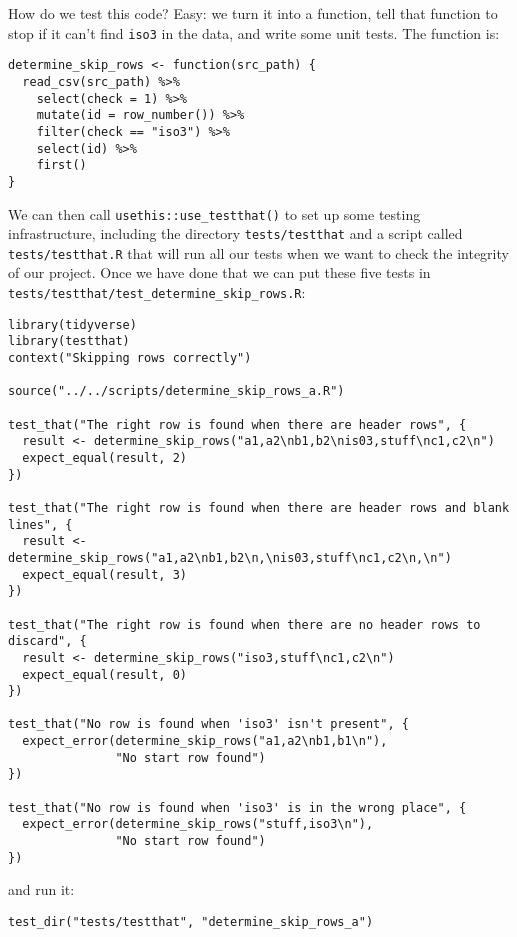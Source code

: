 How do we test this code?
Easy:
we turn it into a function,
tell that function to stop if it can't find \texttt{iso3} in the data,
and write some unit tests.
The function is:

\begin{lstlisting}
determine_skip_rows <- function(src_path) {
  read_csv(src_path) %>%
    select(check = 1) %>%
    mutate(id = row_number()) %>%
    filter(check == "iso3") %>%
    select(id) %>%
    first()
}
\end{lstlisting}

We can then call \texttt{usethis::use\_testthat()} to set up some testing infrastructure,
including the directory \texttt{tests/testthat}
and a script called \texttt{tests/testthat.R}
that will run all our tests when we want to check the integrity of our project.
Once we have done that
we can put these five tests in \texttt{tests/testthat/test\_determine\_skip\_rows.R}:

\begin{lstlisting}
library(tidyverse)
library(testthat)
context("Skipping rows correctly")

source("../../scripts/determine_skip_rows_a.R")

test_that("The right row is found when there are header rows", {
  result <- determine_skip_rows("a1,a2\nb1,b2\nis03,stuff\nc1,c2\n")
  expect_equal(result, 2)
})

test_that("The right row is found when there are header rows and blank lines", {
  result <- determine_skip_rows("a1,a2\nb1,b2\n,\nis03,stuff\nc1,c2\n,\n")
  expect_equal(result, 3)
})

test_that("The right row is found when there are no header rows to discard", {
  result <- determine_skip_rows("iso3,stuff\nc1,c2\n")
  expect_equal(result, 0)
})

test_that("No row is found when 'iso3' isn't present", {
  expect_error(determine_skip_rows("a1,a2\nb1,b1\n"),
               "No start row found")
})

test_that("No row is found when 'iso3' is in the wrong place", {
  expect_error(determine_skip_rows("stuff,iso3\n"),
               "No start row found")
})
\end{lstlisting}

\noindent
and run it:

\begin{lstlisting}
test_dir("tests/testthat", "determine_skip_rows_a")
\end{lstlisting}

